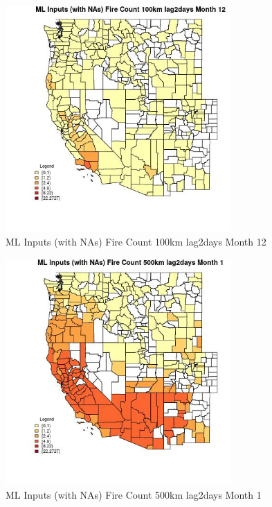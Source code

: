 \begin{figure} 
\centering  
\includegraphics[width=0.77\textwidth]{Code_Outputs/Report_ML_input_PM25_Step4_part_f_de_duplicated_aveswNAs_CountyFire_Count_100km_lag2daysmedianMonth12.jpg} 
\caption{\label{fig:Report_ML_input_PM25_Step4_part_f_de_duplicated_aveswNAsCountyFire_Count_100km_lag2daysmedianMonth12}ML Inputs (with NAs) Fire Count 100km lag2days Month 12} 
\end{figure} 
 

\begin{figure} 
\centering  
\includegraphics[width=0.77\textwidth]{Code_Outputs/Report_ML_input_PM25_Step4_part_f_de_duplicated_aveswNAs_CountyFire_Count_500km_lag2daysmedianMonth1.jpg} 
\caption{\label{fig:Report_ML_input_PM25_Step4_part_f_de_duplicated_aveswNAsCountyFire_Count_500km_lag2daysmedianMonth1}ML Inputs (with NAs) Fire Count 500km lag2days Month 1} 
\end{figure} 
 

